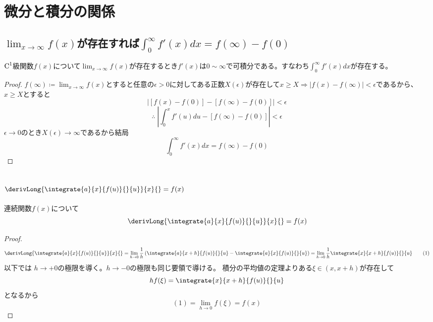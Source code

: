 \chapter{微分と積分の関係}
    \section{\texorpdfstring{$\lim_{x\to\infty}{f(x)}$}{lim x→∞ f(x)}が存在すれば\texorpdfstring{$\int_{0}^{\infty}{f'(x) dx} = f(\infty)-f(0)$}{∫\_0\string^∞ f'(x) = f(∞) - f(0)}}
        \begin{shadebox}
            $\textup{C}^1$級関数$f(x)$について$\displaystyle \lim_{x\to\infty}{f(x)}$が存在するとき$f'(x) $は$0\sim\infty$で可積分である。すなわち$\displaystyle \int_{0}^{\infty}{f'(x) dx}$が存在する。
        \end{shadebox}
        \begin{proof}
            \quad\par
            $\displaystyle f(\infty) \coloneq \lim_{x\to\infty}{f(x)}$とすると任意の$\epsilon>0$に対してある正数$X(\epsilon)$が存在して$x \geq X \Rightarrow |f(x)-f(\infty)| < \epsilon$であるから、$x\geq X$とすると
            \[|[f(x)-f(0)]-[f(\infty)-f(0)]| < \epsilon\]
            \[\therefore \; \left|\int_{0}^{x}{f'(u) du}-[f(\infty)-f(0)]\right| < \epsilon\]
            $\epsilon \to 0$のとき$X(\epsilon) \to \infty$であるから結局
            \[\int_{0}^{\infty}{f'(x) dx} = f(\infty)-f(0)\]
        \end{proof}
    \section{\texorpdfstring{$\derivLong{\integrate{a}{x}{f(u)}{}{u}}{x}{} = f(x)$}{(d/dx)∫\_a\string^x f(u) du = f(x)}}
        \begin{shadebox}
            連続関数$f(x)$について
            \[\derivLong{\integrate{a}{x}{f(u)}{}{u}}{x}{} = f(x)\]
        \end{shadebox}
        \begin{proof}
            \[ \derivLong{\integrate{a}{x}{f(u)}{}{u}}{x}{}= \lim_{h\rightarrow0}{\frac{1}{h}\left(\integrate{a}{x+h}{f(u)}{}{u}-\integrate{a}{x}{f(u)}{}{u}\right)} =  \lim_{h\rightarrow0}{\frac{1}{h}\integrate{x}{x+h}{f(u)}{}{u}} \tag{1} \]
            以下では $h\to +0$の極限を導く。$h\to -0$の極限も同じ要領で導ける。
            積分の平均値の定理よりある$\xi\in(x,x+h)$が存在して
            \[hf(\xi)=\integrate{x}{x+h}{f(u)}{}{u}\]
            となるから
            \[(1) = \lim_{h\rightarrow0}{f(\xi)}=f(x)\]
        \end{proof}
